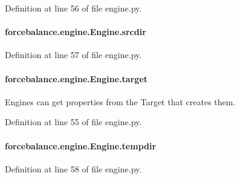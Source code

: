 Definition at line 56 of file engine.\-py.

\hypertarget{classforcebalance_1_1engine_1_1Engine_ad9c499329de6299f0b8acf898d71e7d5}{
\paragraph[{srcdir}]{\setlength{\rightskip}{0pt plus 5cm}forcebalance.\-engine.\-Engine.\-srcdir\hspace{0.3cm}{\ttfamily [inherited]}}}\label{classforcebalance_1_1engine_1_1Engine_ad9c499329de6299f0b8acf898d71e7d5}


Definition at line 57 of file engine.\-py.

\hypertarget{classforcebalance_1_1engine_1_1Engine_a1fdd29fbd127cba331326a3557558e2a}{
\paragraph[{target}]{\setlength{\rightskip}{0pt plus 5cm}forcebalance.\-engine.\-Engine.\-target\hspace{0.3cm}{\ttfamily [inherited]}}}\label{classforcebalance_1_1engine_1_1Engine_a1fdd29fbd127cba331326a3557558e2a}


Engines can get properties from the Target that creates them. 



Definition at line 55 of file engine.\-py.

\hypertarget{classforcebalance_1_1engine_1_1Engine_a7bb2deae7ee926f0df7758a92b382515}{
\paragraph[{tempdir}]{\setlength{\rightskip}{0pt plus 5cm}forcebalance.\-engine.\-Engine.\-tempdir\hspace{0.3cm}{\ttfamily [inherited]}}}\label{classforcebalance_1_1engine_1_1Engine_a7bb2deae7ee926f0df7758a92b382515}


Definition at line 58 of file engine.\-py.

